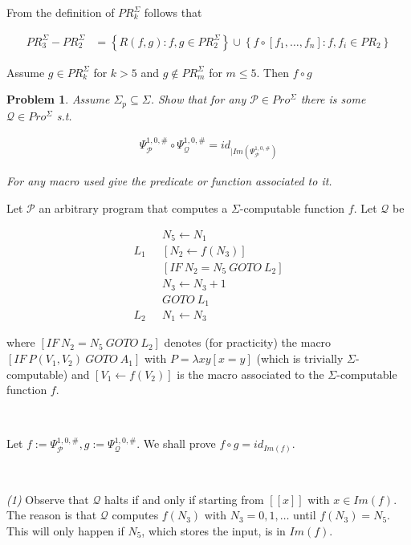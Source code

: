 \documentclass[a4paper, 12pt]{article}
\newtheorem{problem}{Problem}
\newtheorem{problem}{Problem}
\begin{document}
From the definition of $PR_k^{\Sigma}$ follows that

\begin{align*}
    PR_3^{\Sigma} - PR_2^{\Sigma} &= \left\{ R(f, g) : f, g \in PR_2^{\Sigma}
    \right\} \cup \left\{ f \circ [f_1, \ldots, f_n] : f, f_i \in PR_2 \right\}
\end{align*}

Assume $g \in PR_k^{\Sigma}$ for $k > 5$ and $g \not\in PR_{m}^{\Sigma}$ for $m
\leq 5$. Then $f \circ g$ 

\pagebreak 

\begin{problem}
    Assume $\Sigma_p \subseteq \Sigma$. Show that for any $\mathcal{P} \in
    Pro^{\Sigma}$ there is some $\mathcal{Q} \in Pro^{\Sigma}$ s.t. 

    \begin{align*}
        \Psi_{\mathcal{P}}^{1, 0, \#} \circ \Psi_{\mathcal{Q}}^{1, 0, \#} =
        id_{| Im(\Psi_{\mathcal{P}}^{1, 0, \#})}
    \end{align*}


    For any macro used give the predicate or function associated to it.
\end{problem}

Let $\mathcal{P}$ an arbitrary program that computes a $\Sigma$-computable
function $f$. Let $\mathcal{Q}$ be

\begin{align*}
    &N_{5} \leftarrow N_1 \\ 
    L_1 ~ ~ ~ &[N_2 \leftarrow f(N_3)] \\ 
    &[IF ~ N_2 = N_5 ~ GOTO ~ L_2 ] \\ 
    &N_3 \leftarrow  N_3 + 1 \\ 
    &GOTO ~ L_1 \\ 
    L_2 ~ ~ ~ &N_1 \leftarrow N_3
\end{align*}

where $[IF ~ N_2 = N_5 ~ GOTO ~ L_2] $ denotes (for practicity) the macro $[IF ~
P(V_1, V_2) ~ GOTO ~ A_1]$ with $P = \lambda xy \left[  x = y \right]$ (which is
trivially $\Sigma$-computable) and $[V_1 \leftarrow f(V_2)]$ is the macro
associated to the $\Sigma$-computable function $f$.

~

Let $f := \Psi_{\mathcal{P}}^{1, 0, \#}, g := \Psi_{\mathcal{Q}}^{1, 0, \#}$. We
shall prove $f \circ g = id_{Im(f)}$.

~

\textit{(1)} Observe that $\mathcal{Q}$ halts if and only if starting from $[\![
x ]\!]$ with $x \in Im(f)$. The reason is that $\mathcal{Q}$ computes
$f(N_3)$ with $N_3 = 0, 1, \ldots$ until $f(N_3) = N_5$. This will only happen
if $N_5$, which stores the input, is in $Im(f)$.
\end{document}
